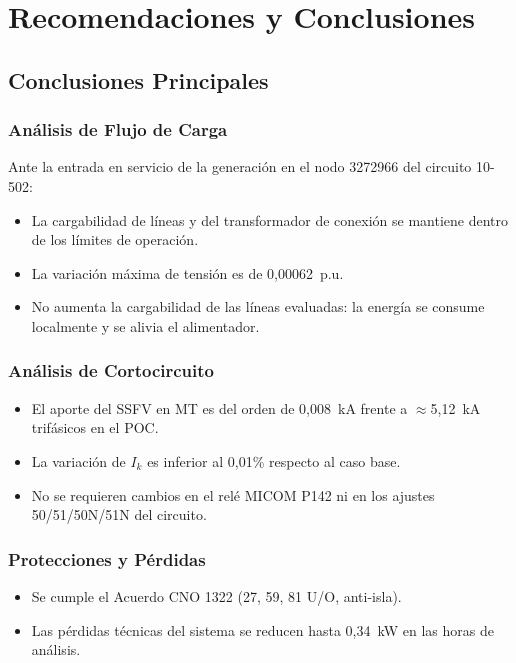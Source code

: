 \chapter{Recomendaciones y Conclusiones}

\section{Conclusiones Principales}

\subsection{Análisis de Flujo de Carga}

Ante la entrada en servicio de la generación en el nodo 3272966 del circuito 10-502:

\begin{itemize}
    \item La cargabilidad de líneas y del transformador de conexión se mantiene dentro de los límites de operación.
    \item La variación máxima de tensión es de 0,00062~p.u.
    \item No aumenta la cargabilidad de las líneas evaluadas: la energía se consume localmente y se alivia el alimentador.
\end{itemize}

\subsection{Análisis de Cortocircuito}

\begin{itemize}
    \item El aporte del SSFV en MT es del orden de 0,008~kA frente a $\approx$5,12~kA trifásicos en el POC.
    \item La variación de $I_k$ es inferior al 0,01\% respecto al caso base.
    \item No se requieren cambios en el relé MICOM P142 ni en los ajustes 50/51/50N/51N del circuito.
\end{itemize}

\subsection{Protecciones y Pérdidas}

\begin{itemize}
    \item Se cumple el Acuerdo CNO 1322 (27, 59, 81 U/O, anti-isla).
    \item Las pérdidas técnicas del sistema se reducen hasta 0,34~kW en las horas de análisis.
\end{itemize}

